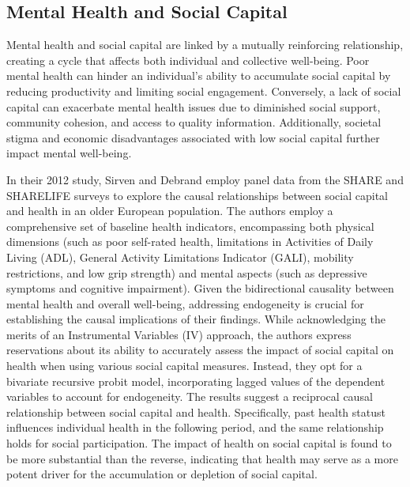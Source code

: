 \subsection{Mental Health and Social Capital}
    Mental health and social capital are linked by a mutually reinforcing relationship, creating a cycle that affects both individual and collective well-being. Poor mental health can hinder an individual's ability to accumulate social capital by reducing productivity and limiting social engagement. Conversely, a lack of social capital can exacerbate mental health issues due to diminished social support, community cohesion, and access to quality information. Additionally, societal stigma and economic disadvantages associated with low social capital further impact mental well-being.

    In their 2012 study, Sirven and Debrand employ panel data from the SHARE and SHARELIFE surveys to explore the causal relationships between social capital and health in an older European population. The authors employ a comprehensive set of baseline health indicators, encompassing both physical dimensions (such as poor self-rated health, limitations in Activities of Daily Living (ADL), General Activity Limitations Indicator (GALI), mobility restrictions, and low grip strength) and mental aspects (such as depressive symptoms and cognitive impairment). Given the bidirectional causality between mental health and overall well-being, addressing endogeneity is crucial for establishing the causal implications of their findings. While acknowledging the merits of an Instrumental Variables (IV) approach, the authors express reservations about its ability to accurately assess the impact of social capital on health when using various social capital measures. Instead, they opt for a bivariate recursive probit model, incorporating lagged values of the dependent variables to account for endogeneity.
    The results suggest a reciprocal causal relationship between social capital and health. Specifically, past health statust influences individual health in the following period, and the same relationship holds for social participation. The impact of health on social capital is found to be more substantial than the reverse, indicating that health may serve as a more potent driver for the accumulation or depletion of social capital. 

